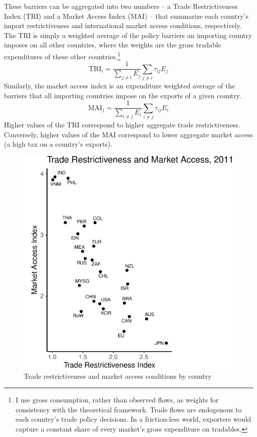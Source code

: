 \documentclass{puthesis}
\begin{document}
These barriers can be aggregated into two numbers -- a Trade
Restrictiveness Index (TRI) and a Market Access Index (MAI) -- that
summarize each country's import restrictiveness and international market
access conditions, respectively. The TRI is simply a weighted average of
the policy barriers an importing country imposes on all other countries,
where the weights are the gross tradable expenditures of these other
countries.\footnote{I use gross consumption, rather than observed flows,
  as weights for consistency with the theoretical framework. Trade flows
  are endogenous to each country's trade policy decisions. In a
  friction-less world, exporters would capture a constant share of every
  market's gross expenditure on tradables.}
\begin{equation} \label{eq:tri}
\text{TRI}_i = \frac{1}{\sum_{j \neq i} E_j} \sum_{j \neq i} \tau_{ij} E_j
\end{equation} Similarly, the market access index is an expenditure
weighted average of the barriers that all importing countries impose on
the exports of a given country. \begin{equation} \label{eq:mai}
\text{MAI}_j = \frac{1}{\sum_{i \neq j} E_i} \sum_{i \neq j} \tau_{ij} E_i
\end{equation} Higher values of the TRI correspond to higher aggregate
trade restrictiveness. Conversely, higher values of the MAI correspond
to lower aggregate market access (a high tax on a country's exports).

\begin{figure}
\centering
\includegraphics{figure/trimai-1.pdf}
\caption{Trade restrictiveness and market access conditions by country
\label{fig:trimai}}
\end{figure}
\end{document}
